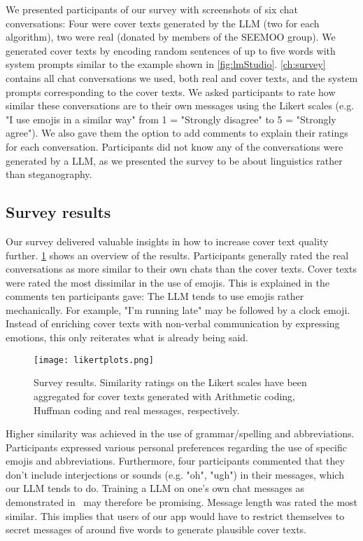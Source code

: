 We presented participants of our survey with screenshots of six chat conversations: Four were cover texts generated by the \gls{LLM} (two for each algorithm), two were real (donated by members of the SEEMOO group). We generated cover texts by encoding random sentences of up to five words with system prompts similar to the example shown in \cref{fig:lmStudio}. \cref{ch:survey} contains all chat conversations we used, both real and cover texts, and the system prompts corresponding to the cover texts. We asked participants to rate how similar these conversations are to their own messages using the Likert scales (e.g. "I use emojis in a similar way" from 1 = "Strongly disagree" to 5 = "Strongly agree"). We also gave them the option to add comments to explain their ratings for each conversation. Participants did not know any of the conversations were generated by a \gls{LLM}, as we presented the survey to be about linguistics rather than steganography.

\subsection{Survey results}
\label{sec:surveyResults}
Our survey delivered valuable insights in how to increase cover text quality further. \cref{fig:likertplots} shows an overview of the results. Participants generally rated the real conversations as more similar to their own chats than the cover texts. Cover texts were rated the most dissimilar in the use of emojis. This is explained in the comments ten participants gave: The \gls{LLM} tends to use emojis rather mechanically. For example, "I'm running late" may be followed by a clock emoji. Instead of enriching cover texts with non-verbal communication by expressing emotions, this only reiterates what is already being said.

\begin{figure}
    \begin{wide}
        \centering
        \captionsetup{width=\linewidth}
        \texttt{[image: likertplots.png]}
        \caption[Survey: Results]{Survey results. Similarity ratings on the Likert scales have been aggregated for cover texts generated with Arithmetic coding, Huffman coding and real messages, respectively.}
        \label{fig:likertplots}
    \end{wide}
\end{figure}

Higher similarity was achieved in the use of grammar/spelling and abbreviations. Participants expressed various personal preferences regarding the use of specific emojis and abbreviations. Furthermore, four participants commented that they don't include interjections or sounds (e.g. "oh", "ugh") in their messages, which our \gls{LLM} tends to do. Training a \gls{LLM} on one's own chat messages as demonstrated in~\cite{donnerSimulationMeFinetuning2024} may therefore be promising. Message length was rated the most similar. This implies that users of our app would have to restrict themselves to secret messages of around five words to generate plausible cover texts.

